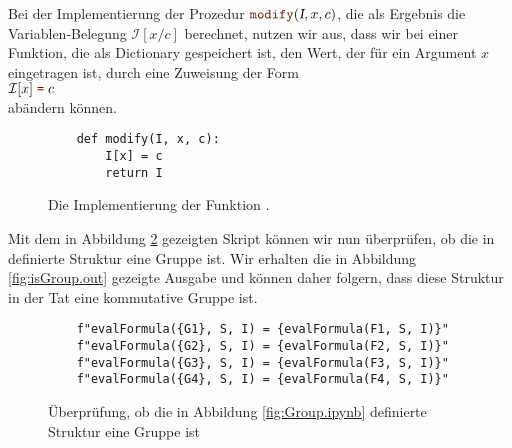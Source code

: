 Bei der Implementierung der Prozedur $\mytt{modify}(\textsl{I},x,c)$, die als Ergebnis die Variablen-Belegung $\mathcal{I}[x/c]$ berechnet, nutzen wir aus, dass
wir bei einer Funktion, die als Dictionary gespeichert ist, den Wert, der für ein Argument $x$ eingetragen ist,
durch eine Zuweisung der Form 
\\[0.2cm]
\hspace*{1.3cm}
$\mathcal{I}[x] \;\mytt{=}\; c$ 
\\[0.2cm]
abändern können.

\begin{figure}[!ht]
\centering
\begin{verbatim}
    def modify(I, x, c):
        I[x] = c
        return I
\end{verbatim}
\vspace*{-0.3cm}
\caption{Die Implementierung der Funktion .}
\label{fig:modify.ipynb}
\end{figure}
Mit dem in Abbildung \ref{fig:isGroup.ipynb} gezeigten Skript können wir nun überprüfen, ob die in
 definierte Struktur eine Gruppe ist.  Wir erhalten die in Abbildung \ref{fig:isGroup.out}
gezeigte Ausgabe und können daher folgern, dass diese Struktur in der Tat eine kommutative Gruppe ist.

\begin{figure}[!ht]
\centering
\begin{verbatim}
    f"evalFormula({G1}, S, I) = {evalFormula(F1, S, I)}"
    f"evalFormula({G2}, S, I) = {evalFormula(F2, S, I)}"
    f"evalFormula({G3}, S, I) = {evalFormula(F3, S, I)}"
    f"evalFormula({G4}, S, I) = {evalFormula(F4, S, I)}"
\end{verbatim}
\vspace*{-0.3cm}
\caption{Überprüfung, ob die in Abbildung \ref{fig:Group.ipynb} definierte Struktur eine Gruppe ist}
\label{fig:isGroup.ipynb}
\end{figure}

